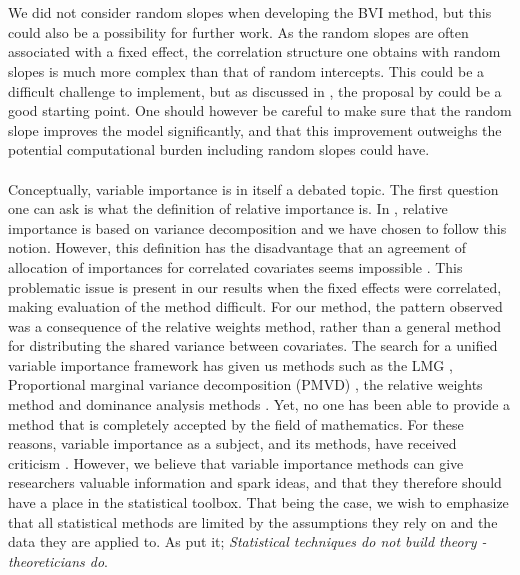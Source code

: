 \\
\\
We did not consider random slopes when developing the BVI method, but this could also be a possibility for further work. As the random slopes are often associated with a fixed effect, the correlation structure one obtains with random slopes is much more complex than that of random intercepts. This could be a difficult challenge to implement, but as discussed in , the proposal by \citet{Johnson2014} could be a good starting point. One should however be careful to make sure that the random slope improves the model significantly, and that this improvement outweighs the potential computational burden including random slopes could have.
\\
\\
Conceptually, variable importance is in itself a debated topic. The first question one can ask is what the definition of relative importance is. In \citet{gromping_relaimpo}, relative importance is based on variance decomposition and we have chosen to follow this notion. However, this definition has the disadvantage that an agreement of allocation of importances for correlated covariates seems impossible \citep{Gromping_2015}. This problematic issue is present in our results when the fixed effects were correlated, making evaluation of the method difficult. For our method, the pattern observed was a consequence of the relative weights method, rather than a general method for distributing the shared variance between covariates. The search for a unified variable importance framework has given us methods such as the LMG \citep{gromping_relaimpo}, Proportional marginal variance decomposition (PMVD) \citep{gromping_relaimpo}, the relative weights method \citep{johnson_relative_weights} and dominance analysis methods \citep{budescu1993dominance}. Yet, no one has been able to provide a method that is completely accepted by the field of mathematics. For these reasons, variable importance as a subject, and its methods, have received criticism \citep{gromping_relaimpo}. However, we believe that variable importance methods can give researchers valuable information and spark ideas, and that they therefore should have a place in the statistical toolbox. That being the case, we wish to emphasize that all statistical methods are limited by the assumptions they rely on and the data they are applied to. As \citet{Sutherland_91} put it; \textit{Statistical techniques do not build theory - theoreticians do}.


